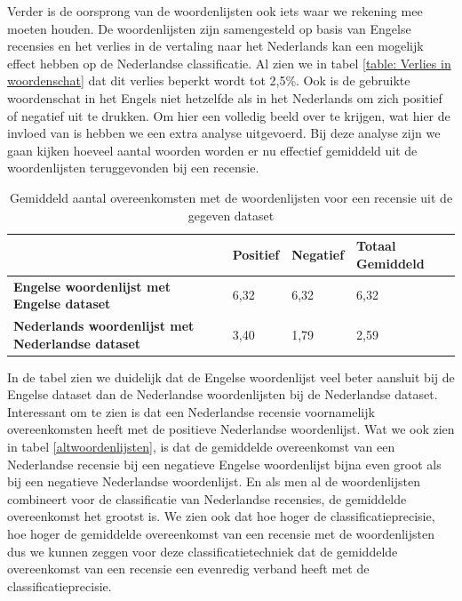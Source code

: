 Verder is de oorsprong van de woordenlijsten ook iets waar we rekening mee moeten houden. De woordenlijsten zijn samengesteld op basis van Engelse recensies en het verlies in de vertaling naar het Nederlands kan een mogelijk effect hebben op de Nederlandse classificatie. Al zien we in tabel \ref{table: Verlies in woordenschat} dat dit verlies beperkt wordt tot 2,5\%. Ook is de gebruikte woordenschat in het Engels niet hetzelfde als in het Nederlands om zich positief of negatief uit te drukken. Om hier een volledig beeld over te krijgen, wat hier de invloed van is hebben we een extra analyse uitgevoerd. Bij deze analyse zijn we gaan kijken hoeveel aantal woorden worden er nu effectief gemiddeld uit de woordenlijsten teruggevonden bij een recensie.\\

\begin{table}[h]
\centering
\begin{tabular}{l|l|l|l|}
\cline{2-4}
                                                 & {\bf Positief} & {\bf Negatief} & {\bf Totaal Gemiddeld} \\ \hline
\multicolumn{1}{|l|}{{\bf Engelse woordenlijst met Engelse dataset}} & 6,32           & 6,32           & 6,32            \\ \hline
\multicolumn{1}{|l|}{{\bf Nederlands woordenlijst met Nederlandse dataset}}           & 3,40           & 1,79           & 2,59            \\ \hline
\end{tabular}
\caption{Gemiddeld aantal overeenkomsten met de woordenlijsten voor een recensie uit de gegeven dataset}
\end{table}

In de tabel zien we duidelijk dat de Engelse woordenlijst veel beter aansluit bij de Engelse dataset dan de Nederlandse woordenlijsten bij de Nederlandse dataset. Interessant om te zien is dat een Nederlandse recensie voornamelijk overeenkomsten heeft met de positieve Nederlandse woordenlijst. Wat we ook zien in tabel \ref{altwoordenlijsten}, is dat de gemiddelde overeenkomst van een Nederlandse recensie bij een negatieve Engelse woordenlijst bijna even groot als bij een negatieve Nederlandse woordenlijst. En als men al de woordenlijsten combineert voor de classificatie van Nederlandse recensies, de gemiddelde overeenkomst het grootst is. We zien ook dat hoe hoger de classificatieprecisie, hoe hoger de gemiddelde overeenkomst van een recensie met de woordenlijsten dus we kunnen zeggen voor deze classificatietechniek dat de gemiddelde overeenkomst van een recensie een evenredig verband heeft met de classificatieprecisie.\\

